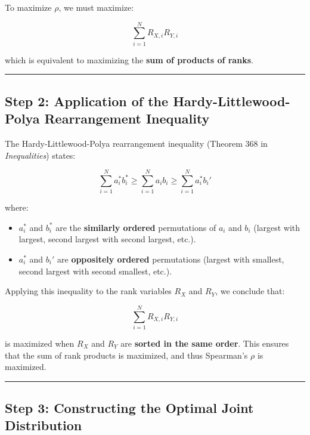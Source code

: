 \documentclass[
  12pt,
  letterpaper,
  DIV=11,
  numbers=noendperiod]{scrartcl}
\providecommand{\tightlist}{%
  \setlength{\itemsep}{0pt}\setlength{\parskip}{0pt}}\usepackage{longtable,booktabs,array}
\begin{document}
To maximize \(\rho\), we must maximize:

\[\sum_{i=1}^{N} R_{X,i} R_{Y,i}\]

which is equivalent to maximizing the \textbf{sum of products of ranks}.

\begin{center}\rule{0.5\linewidth}{0.5pt}\end{center}

\subsection{\texorpdfstring{\textbf{Step 2: Application of the
Hardy-Littlewood-Polya Rearrangement
Inequality}}{Step 2: Application of the Hardy-Littlewood-Polya Rearrangement Inequality}}\label{step-2-application-of-the-hardy-littlewood-polya-rearrangement-inequality}

The Hardy-Littlewood-Polya rearrangement inequality (Theorem 368 in
\emph{Inequalities}) states:

\[\sum_{i=1}^{N} a_i^* b_i^* \geq \sum_{i=1}^{N} a_i b_i \geq \sum_{i=1}^{N} a_i^* b_i'\]

where:

\begin{itemize}
\tightlist
\item
  \(a_i^*\) and \(b_i^*\) are the \textbf{similarly ordered}
  permutations of \(a_i\) and \(b_i\) (largest with largest, second
  largest with second largest, etc.).
\item
  \(a_i^*\) and \(b_i'\) are \textbf{oppositely ordered} permutations
  (largest with smallest, second largest with second smallest, etc.).
\end{itemize}

Applying this inequality to the rank variables \(R_X\) and \(R_Y\), we
conclude that:

\[\sum_{i=1}^{N} R_{X,i} R_{Y,i}\]

is maximized when \(R_X\) and \(R_Y\) are \textbf{sorted in the same
order}. This ensures that the sum of rank products is maximized, and
thus Spearman's \(\rho\) is maximized.

\begin{center}\rule{0.5\linewidth}{0.5pt}\end{center}

\subsection{\texorpdfstring{\textbf{Step 3: Constructing the Optimal
Joint
Distribution}}{Step 3: Constructing the Optimal Joint Distribution}}\label{step-3-constructing-the-optimal-joint-distribution}
\end{document}
